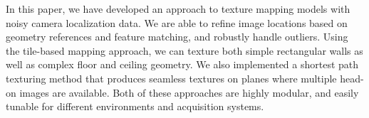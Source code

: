 \documentclass[]{spie}  %
\begin{document}
In this paper, we have developed an approach to texture mapping models
with noisy camera localization data. We are able to refine image
locations based on geometry references and feature matching, and
robustly handle outliers. Using the tile-based mapping approach, we
can texture both simple rectangular walls as well as complex floor and
ceiling geometry. We also implemented a shortest path texturing method
that produces seamless textures on planes where multiple head-on
images are available. Both of these approaches are highly modular, and
easily tunable for different environments and acquisition systems.

\begin{figure}
  \centering
   ~~~~~~~~
  \centering

  \centering {}


\end{figure}
\end{document}

